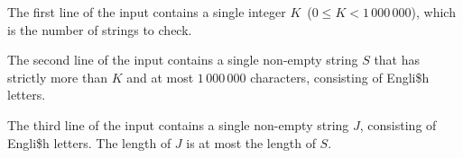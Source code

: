 The first line of the input contains a single integer $K$~($0 \leq K < 1\,000\,000$),
which is the number of strings to check.

The second line of the input contains a single non-empty string $S$ that has strictly more than $K$ and at most $1\,000\,000$ characters, consisting of Engli\$h letters.

The third line of the input contains a single non-empty string $J$, consisting of Engli\$h letters. The length of $J$ is at most the length of $S$.
